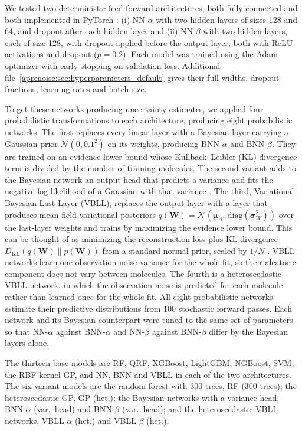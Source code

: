 We tested two deterministic feed-forward architectures, both fully connected and both implemented in PyTorch \citep{Paszke2019}: (i) NN-$\alpha$ with two hidden layers of sizes 128 and 64, and dropout after each hidden layer and (ii) NN-$\beta$ with two hidden layers, each of size 128, with dropout applied before the output layer, both with ReLU activations and dropout ($p = 0.2$). Each model was trained using the Adam optimizer with early stopping on validation loss. Additional file~\ref{app:noise:sec:hyperparameters_default} gives their full widths, dropout fractions, learning rates and batch size.

To get these networks producing uncertainty estimates, we applied four probabilistic transformations to each architecture, producing eight probabilistic networks. The first replaces every linear layer with a Bayesian layer carrying a Gaussian prior $\mathcal{N}(0, 0.1^2)$ on its weights, producing BNN-$\alpha$ and BNN-$\beta$. They are trained on an evidence lower bound whose  Kullback–Leibler (KL) divergence term is divided by the number of training molecules. The second variant adds to the Bayesian network an output head that predicts a variance and fits the negative log likelihood of a Gaussian with that variance \citep{kendall2017}. The third, Variational Bayesian Last Layer (VBLL), replaces the output layer with a layer that produces mean-field variational posteriors $q(\mathbf{W}) = \mathcal{N}(\boldsymbol{\mu}_W, \text{diag}(\boldsymbol{\sigma}_W^2))$ over the last-layer weights and trains by maximizing the evidence lower bound. This can be thought of as minimizing the reconstruction loss plus KL divergence $D_{\text{KL}}(q(\mathbf{W}) \| p(\mathbf{W}))$ from a standard normal prior, scaled by $1/N$ \citep{Harrison2024}. VBLL networks learn one observation-noise variance for the whole fit, so their aleatoric component does not vary between molecules. The fourth is a heteroscedastic VBLL network, in which the observation noise is predicted for each molecule rather than learned once for the whole fit. All eight probabilistic networks estimate their predictive distributions from 100 stochastic forward passes. Each network and its Bayesian counterpart were tuned to the same set of parameters so that NN-$\alpha$ against BNN-$\alpha$ and NN-$\beta$ against BNN-$\beta$ differ by the Bayesian layers alone.

The thirteen base models are RF, QRF, XGBoost, LightGBM, NGBoost, SVM, the RBF-kernel GP, and NN, BNN and VBLL in each of the two architectures. The six variant models are the random forest with 300 trees, RF (300 trees); the heteroscedastic GP, GP (het.); the Bayesian networks with a variance head, BNN-$\alpha$ (var.\ head) and BNN-$\beta$ (var.\ head); and the heteroscedastic VBLL networks, VBLL-$\alpha$ (het.) and VBLL-$\beta$ (het.).


